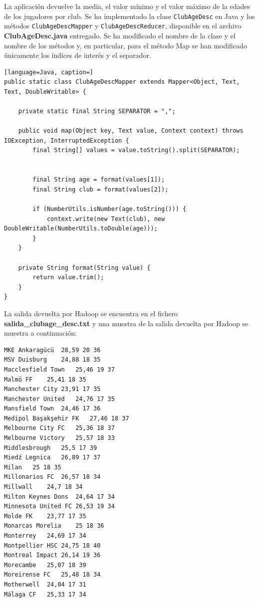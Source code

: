 \documentclass[10pt,swedish, openany]{book}
\begin{document}
La aplicación devuelve la media, el valor mínimo y el valor máximo de la edades de los jugadores por club. Se ha implementado la clase \texttt{ClubAgeDesc} en Java y los métodos \texttt{ClubAgeDescMapper} y \texttt{ClubAgeDescReducer}, disponible en el archivo \textbf{ClubAgeDesc.java} entregado. 
Se ha modificado el nombre de la clase y el nombre de los métodos y, en particular, para el método Map se han modificado únicamente los índices de interés y el separador.
\begin{lstlisting}[language=Java, caption=]
public static class ClubAgeDescMapper extends Mapper<Object, Text, Text, DoubleWritable> {

    private static final String SEPARATOR = ",";
    
    public void map(Object key, Text value, Context context) throws IOException, InterruptedException {
    	final String[] values = value.toString().split(SEPARATOR);
    
    	
    	final String age = format(values[1]);
    	final String club = format(values[2]);
    
    	if (NumberUtils.isNumber(age.toString())) {
    		context.write(new Text(club), new DoubleWritable(NumberUtils.toDouble(age)));
    	}
    }
    
    private String format(String value) {
    	return value.trim();
    }
}
\end{lstlisting}

La salida devuelta por Hadoop se encuentra en el fichero \textbf{salida\_clubage\_desc.txt} y una muestra de la salida devuelta por Hadoop se muestra a continuación:
\begin{verbatim}
MKE Ankaragücü	28,59 20 36
MSV Duisburg	24,88 18 35
Macclesfield Town	25,46 19 37
Malmö FF	25,41 18 35
Manchester City	23,91 17 35
Manchester United	24,76 17 35
Mansfield Town	24,46 17 36
Medipol Başakşehir FK	27,46 18 37
Melbourne City FC	25,36 18 37
Melbourne Victory	25,57 18 33
Middlesbrough	25,5 17 39
Miedź Legnica	26,89 17 37
Milan	25 18 35
Millonarios FC	26,57 18 34
Millwall	24,7 18 34
Milton Keynes Dons	24,64 17 34
Minnesota United FC	26,53 19 34
Molde FK	23,77 17 35
Monarcas Morelia	25 18 36
Monterrey	24,69 17 34
Montpellier HSC	24,75 18 40
Montreal Impact	26,14 19 36
Morecambe	25,07 18 39
Moreirense FC	25,48 18 34
Motherwell	24,04 17 31
Málaga CF	25,33 17 34
\end{verbatim}
\end{document}
